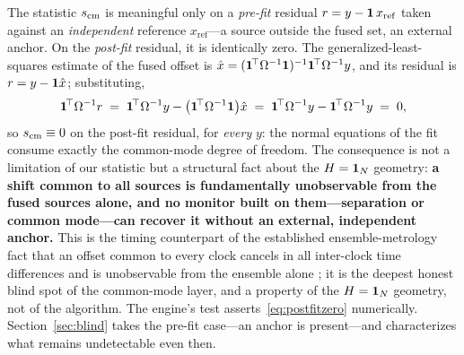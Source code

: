 \begin{remark}
\label{rem:i2}
The statistic $s_{\mathrm{cm}}{}$ is meaningful only on a \emph{pre-fit} residual
$r=y-\bm 1\,x_{\mathrm{ref}}$ taken against an \emph{independent} reference
$x_{\mathrm{ref}}$---a source outside the fused set, an external anchor. On the
\emph{post-fit} residual, it is identically zero. The generalized-least-squares
estimate of the fused offset is
$\hat x=(\bm 1^{\!\top}\Omega^{-1}\bm 1)^{-1}\bm 1^{\!\top}\Omega^{-1}y$, and its
residual is $r=y-\bm 1\hat x$; substituting,
\begin{equation}
  \bm 1^{\!\top}\Omega^{-1} r
  \;=\; \bm 1^{\!\top}\Omega^{-1}y - \big(\bm 1^{\!\top}\Omega^{-1}\bm 1\big)\hat x
  \;=\; \bm 1^{\!\top}\Omega^{-1}y - \bm 1^{\!\top}\Omega^{-1}y
  \;=\; 0,
  \label{eq:postfitzero}
\end{equation}
so $s_{\mathrm{cm}}{}\equiv0$ on the post-fit residual, for \emph{every} $y$: the normal
equations of the fit consume exactly the common-mode degree of freedom. The
consequence is not a limitation of our statistic but a structural fact about the
$H=\bm 1_N$ geometry: \textbf{a shift common to all sources is fundamentally
unobservable from the fused sources alone, and no monitor built on them---separation
or common mode---can recover it without an external, independent anchor.} This is
the timing counterpart of the established ensemble-metrology fact that an offset
common to every clock cancels in all inter-clock time differences and is
unobservable from the ensemble alone \citep{trainotti2022}; it is the deepest honest
blind spot of the common-mode layer, and a property of the $H=\bm 1_N$ geometry,
not of the algorithm. The engine's
 test
asserts~\eqref{eq:postfitzero} numerically. Section~\ref{sec:blind} takes the pre-fit case---an anchor is
present---and characterizes what remains undetectable even then.
\end{remark}
